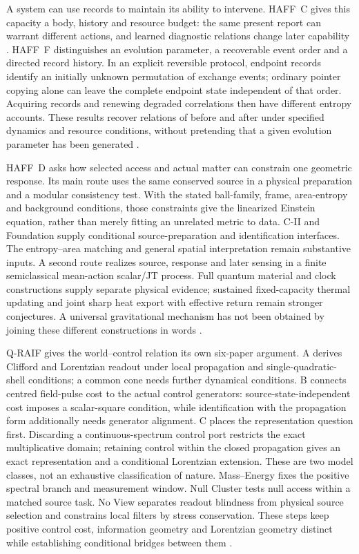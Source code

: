 \documentclass[12pt,a4paper]{article}
\begin{document}
A system can use records to maintain its ability to intervene. HAFF~C gives this capacity a body, history and resource budget: the same present report can warrant different actions, and learned diagnostic relations change later capability \cite{HAFFC}. HAFF~F distinguishes an evolution parameter, a recoverable event order and a directed record history. In an explicit reversible protocol, endpoint records identify an initially unknown permutation of exchange events; ordinary pointer copying alone can leave the complete endpoint state independent of that order. Acquiring records and renewing degraded correlations then have different entropy accounts. These results recover relations of before and after under specified dynamics and resource conditions, without pretending that a given evolution parameter has been generated \cite{HAFFF}.

HAFF~D asks how selected access and actual matter can constrain one geometric response. Its main route uses the same conserved source in a physical preparation and a modular consistency test. With the stated ball-family, frame, area-entropy and background conditions, those constraints give the linearized Einstein equation, rather than merely fitting an unrelated metric to data. C-II and Foundation supply conditional source-preparation and identification interfaces. The entropy--area matching and general spatial interpretation remain substantive inputs. A second route realizes source, response and later sensing in a finite semiclassical mean-action scalar/JT process. Full quantum material and clock constructions supply separate physical evidence; sustained fixed-capacity thermal updating and joint sharp heat export with effective return remain stronger conjectures. A universal gravitational mechanism has not been obtained by joining these different constructions in words \cite{HAFFD,Foundation,Consciousness}.

Q-RAIF gives the world--control relation its own six-paper argument. A derives Clifford and Lorentzian readout under local propagation and single-quadratic-shell conditions; a common cone needs further dynamical conditions. B connects centred field-pulse cost to the actual control generators: source-state-independent cost imposes a scalar-square condition, while identification with the propagation form additionally needs generator alignment. C places the representation question first. Discarding a continuous-spectrum control port restricts the exact multiplicative domain; retaining control within the closed propagation gives an exact representation and a conditional Lorentzian extension. These are two model classes, not an exhaustive classification of nature. Mass--Energy fixes the positive spectral branch and measurement window. Null Cluster tests null access within a matched source task. No View separates readout blindness from physical source selection and constrains local filters by stress conservation. These steps keep positive control cost, information geometry and Lorentzian geometry distinct while establishing conditional bridges between them \cite{QRAIF}.
\end{document}
